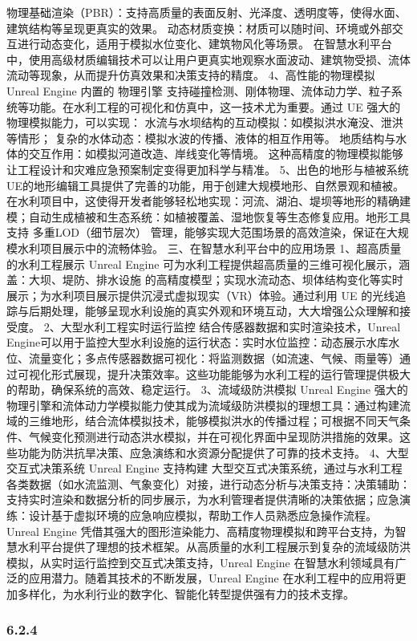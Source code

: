 {物理基础渲染（PBR）：支持高质量的表面反射、光泽度、透明度等，使得水面、建筑结构等呈现更真实的效果。 动态材质变换：材质可以随时间、环境或外部交互进行动态变化，适用于模拟水位变化、建筑物风化等场景。
在智慧水利平台中，使用高级材质编辑技术可以让用户更真实地观察水面波动、建筑物受损、流体流动等现象，从而提升仿真效果和决策支持的精度。 4、高性能的物理模拟 Unreal Engine 内置的 物理引擎
支持碰撞检测、刚体物理、流体动力学、粒子系统等功能。在水利工程的可视化和仿真中，这一技术尤为重要。通过 UE 强大的物理模拟能力，可以实现： 水流与水坝结构的互动模拟：如模拟洪水淹没、泄洪等情形；
复杂的水体动态：模拟水波的传播、液体的相互作用等。 地质结构与水体的交互作用：如模拟河道改造、岸线变化等情境。 这种高精度的物理模拟能够让工程设计和灾难应急预案制定变得更加科学与精准。 5、出色的地形与植被系统
UE的地形编辑工具提供了完善的功能，用于创建大规模地形、自然景观和植被。在水利项目中，这使得开发者能够轻松地实现：河流、湖泊、堤坝等地形的精确建模；自动生成植被和生态系统：如植被覆盖、湿地恢复等生态修复应用。地形工具支持
多重LOD（细节层次） 管理，能够实现大范围场景的高效渲染，保证在大规模水利项目展示中的流畅体验。 三、在智慧水利平台中的应用场景 1、超高质量的水利工程展示 Unreal Engine
可为水利工程提供超高质量的三维可视化展示，涵盖：大坝、堤防、排水设施 的高精度模型；实现水流动态、坝体结构变化等实时展示；为水利项目展示提供沉浸式虚拟现实（VR）体验。通过利用 UE
的光线追踪与后期处理，能够呈现水利设施的真实外观和环境互动，大大增强公众理解和接受度。 2、大型水利工程实时运行监控 结合传感器数据和实时渲染技术，Unreal
Engine可以用于监控大型水利设施的运行状态：实时水位监控：动态展示水库水位、流量变化；多点传感器数据可视化：将监测数据（如流速、气候、雨量等）通过可视化形式展现，提升决策效率。这些功能能够为水利工程的运行管理提供极大的帮助，确保系统的高效、稳定运行。
3、流域级防洪模拟 Unreal Engine
强大的物理引擎和流体动力学模拟能力使其成为流域级防洪模拟的理想工具：通过构建流域的三维地形，结合流体模拟技术，能够模拟洪水的传播过程；可根据不同天气条件、气候变化预测进行动态洪水模拟，并在可视化界面中呈现防洪措施的效果。这些功能为防洪抗旱决策、应急演练和水资源分配提供了可靠的技术支持。
4、大型交互式决策系统 Unreal Engine 支持构建
大型交互式决策系统，通过与水利工程各类数据（如水流监测、气象变化）对接，进行动态分析与决策支持：决策辅助：支持实时渲染和数据分析的同步展示，为水利管理者提供清晰的决策依据；应急演练：设计基于虚拟环境的应急响应模拟，帮助工作人员熟悉应急操作流程。
Unreal Engine 凭借其强大的图形渲染能力、高精度物理模拟和跨平台支持，为智慧水利平台提供了理想的技术框架。从高质量的水利工程展示到复杂的流域级防洪模拟，从实时运行监控到交互式决策支持，Unreal Engine
在智慧水利领域具有广泛的应用潜力。随着其技术的不断发展，Unreal Engine 在水利工程中的应用将更加多样化，为水利行业的数字化、智能化转型提供强有力的技术支撑。 \subsubsection{6.2.4
}}
